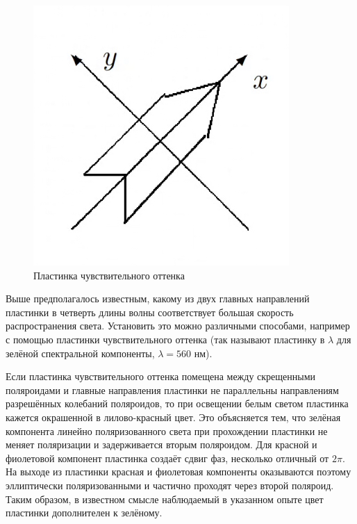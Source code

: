 \documentclass[14pt, a4paper]{report}
\begin{document}
\begin{figure}
	\includegraphics[width=\linewidth]{../images/473_3}
	\caption{Пластинка
чувствительного
оттенка}
	\label{ris 3}
\end{figure}

Выше предполагалось известным, какому из двух главных направлений пластинки в четверть длины волны соответствует большая скорость распространения света.
Установить это можно различными способами, например с помощью
пластинки чувствительного оттенка (так называют пластинку в $ \lambda $
для зелёной спектральной компоненты, $ \lambda = 560 $ нм).

Если пластинка чувствительного оттенка помещена между скрещенными поляроидами и главные направления пластинки не параллельны
направлениям разрешённых колебаний поляроидов, то при освещении
белым светом пластинка кажется окрашенной в лилово-красный цвет.
Это объясняется тем, что зелёная компонента линейно поляризованного света при прохождении пластинки не меняет поляризации и задерживается вторым поляроидом. Для красной и фиолетовой компонент
пластинка создаёт сдвиг фаз, несколько отличный от $ 2\pi $. На выходе
из пластинки красная и фиолетовая компоненты оказываются поэтому
эллиптически поляризованными и частично проходят через второй поляроид. Таким образом, в известном смысле наблюдаемый в указанном
опыте цвет пластинки дополнителен к зелёному.
\end{document}
